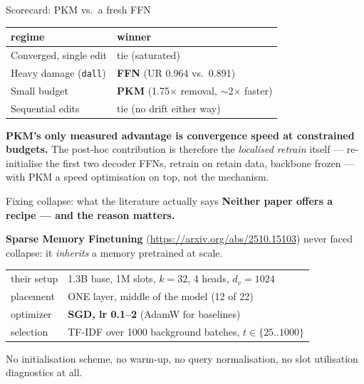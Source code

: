 \documentclass{beamer}
\begin{document}
\begin{frame}{Scorecard: PKM vs.\ a fresh FFN}
\begin{center}
\begin{tabular}{|l|l|}
\hline
regime & winner \\
\hline
Converged, single edit       & tie (saturated) \\
Heavy damage (\texttt{dall}) & \textbf{FFN} (UR 0.964 vs.\ 0.891) \\
Small budget                 & \textbf{PKM} (1.75$\times$ removal, $\sim$2$\times$ faster) \\
Sequential edits             & tie (no drift either way) \\
\hline
\end{tabular}
\end{center}

\medskip
\textbf{PKM's only measured advantage is convergence speed at constrained
budgets.} The post-hoc contribution is therefore the \emph{localised retrain}
itself --- re-initialise the first two decoder FFNs, retrain on retain data,
backbone frozen --- with PKM a speed optimisation on top, not the mechanism.
\end{frame}

\begin{frame}{Fixing collapse: what the literature actually says}
\textbf{Neither paper offers a recipe --- and the reason matters.}

\medskip
\textbf{Sparse Memory Finetuning} (\url{https://arxiv.org/abs/2510.15103}) never
faced collapse: it \emph{inherits} a memory pretrained at scale.
\begin{center}
\begin{tabular}{|l|l|}
\hline
their setup & 1.3B base, 1M slots, $k{=}32$, 4 heads, $d_v{=}1024$ \\
placement & ONE layer, middle of the model (12 of 22) \\
optimizer & \textbf{SGD, lr 0.1--2} (AdamW for baselines) \\
selection & TF-IDF over 1000 background batches, $t \in \{25..1000\}$ \\
\hline
\end{tabular}
\end{center}
No initialisation scheme, no warm-up, no query normalisation, \alert{no slot
utilisation diagnostics at all}.

\end{frame}
\end{document}
